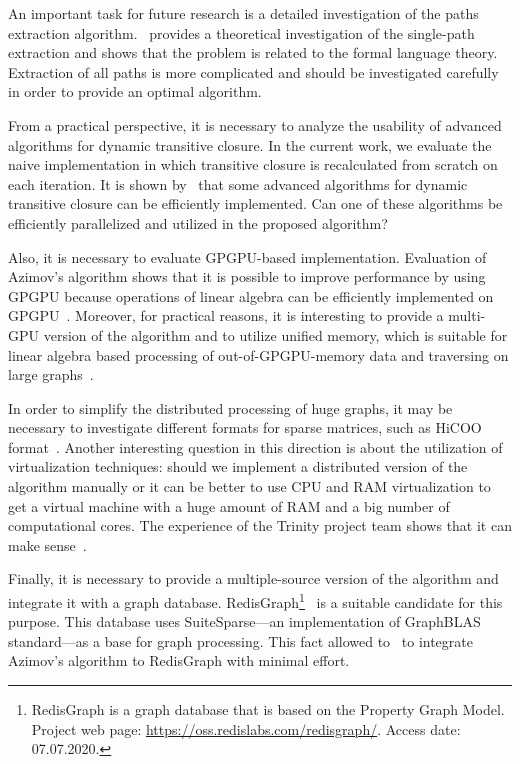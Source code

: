 An important task for future research is a detailed investigation of the paths extraction algorithm.~\cite{HellSinglePath} provides a theoretical investigation of the single-path extraction and shows that the problem is related to the formal language theory.
Extraction of all paths is more complicated and should be investigated carefully in order to provide an optimal algorithm.


From a practical perspective, it is necessary to analyze the usability of advanced algorithms for dynamic transitive closure.
In the current work, we evaluate the naive implementation in which transitive closure is recalculated from scratch on each iteration.
It is shown by~\cite{cs6345} that some advanced algorithms for dynamic transitive closure can be efficiently implemented.
Can one of these algorithms be efficiently parallelized and utilized in the proposed algorithm?


Also, it is necessary to evaluate GPGPU-based implementation.
Evaluation of Azimov's algorithm shows that it is possible to improve performance by using GPGPU because operations of linear algebra can be efficiently implemented on GPGPU~\cite{Mishin:2019:ECP:3327964.3328503,10.1145/3398682.3399163}.
Moreover, for practical reasons, it is interesting to provide a multi-GPU version of the algorithm and to utilize unified memory, which is suitable for linear algebra based processing of out-of-GPGPU-memory data and traversing on large graphs~\cite{8946118,10.14778/3384345.3384358}.

In order to simplify the distributed processing of huge graphs, it may be necessary to investigate different formats for sparse matrices, such as HiCOO format~\cite{10.5555/3291656.3291682}.
Another interesting question in this direction is about the utilization of virtualization techniques: should we implement a distributed version of the algorithm manually or it can be better to use CPU and RAM virtualization to get a virtual machine with a huge amount of RAM and a big number of computational cores.
The experience of the Trinity project team shows that it can make sense~\cite{10.1145/2463676.2467799}.

Finally, it is necessary to provide a multiple-source version of the algorithm and integrate it with a graph database.
RedisGraph\footnote{RedisGraph is a graph database that is based on the Property Graph
Model. Project web page: \url{https://oss.redislabs.com/redisgraph/}. Access date:
07.07.2020.}~\cite{8778293} is a suitable candidate for this purpose.
This database uses SuiteSparse---an implementation of GraphBLAS standard---as a base for graph processing.
This fact allowed to~\cite{10.1145/3398682.3399163} to integrate Azimov's algorithm to RedisGraph with minimal effort.
